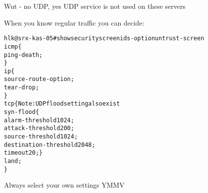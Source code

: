 \documentclass[Screen16to9,17pt]{foils}
\begin{document}
Wut - no UDP, yes UDP service is not used on these servers



When you know regular traffic you can decide:

\begin{alltt}\footnotesize
hlk@srx-kas-05# show security screen ids-option untrust-screen
icmp \{
    ping-death;
\}
ip \{
    source-route-option;
    tear-drop;
\}
tcp \{    Note: UDP flood setting also exist
    syn-flood \{
        alarm-threshold 1024;
        attack-threshold 200;
        source-threshold 1024;
        destination-threshold 2048;
        timeout 20;    \}
    land;
\}
\end{alltt}

Always select your own settings YMMV
\end{document}
